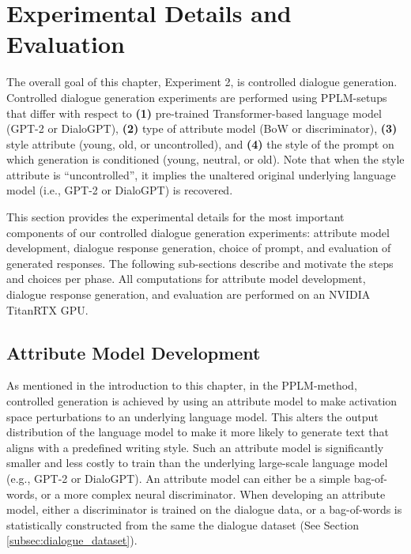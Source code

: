 \section{Experimental Details and Evaluation}

The overall goal of this chapter, Experiment 2, is controlled dialogue generation. Controlled dialogue generation experiments are performed using PPLM-setups that differ with respect to \textbf{(1)} pre-trained Transformer-based language model (GPT-2 or DialoGPT), \textbf{(2)} type of attribute model (BoW or discriminator), \textbf{(3)} style attribute (young, old, or uncontrolled), and \textbf{(4)} the style of the prompt on which generation is conditioned (young, neutral, or old). Note that when the style attribute is ``uncontrolled'', it implies the unaltered original underlying language model (i.e., GPT-2 or DialoGPT) is recovered.

This section provides the experimental details for the most important components of our controlled dialogue generation experiments: attribute model development, dialogue response generation, choice of prompt, and evaluation of generated responses. The following sub-sections describe and motivate the steps and choices per phase. All computations for attribute model development, dialogue response generation, and evaluation are performed on an NVIDIA TitanRTX GPU.


\subsection{Attribute Model Development}
\label{subsec:att_model_dev}
As mentioned in the introduction to this chapter, in the PPLM-method, controlled generation is achieved by using an attribute model to make activation space perturbations to an underlying language model. This alters the output distribution of the language model to make it more likely to generate text that aligns with a predefined writing style. Such an attribute model is significantly smaller and less costly to train than the underlying large-scale language model (e.g., GPT-2 or DialoGPT). An attribute model can either be a simple bag-of-words, or a more complex neural discriminator. When developing an attribute model, either a discriminator is trained on the dialogue data, or a bag-of-words is statistically constructed from the same the dialogue dataset (See Section \ref{subsec:dialogue_dataset}).

